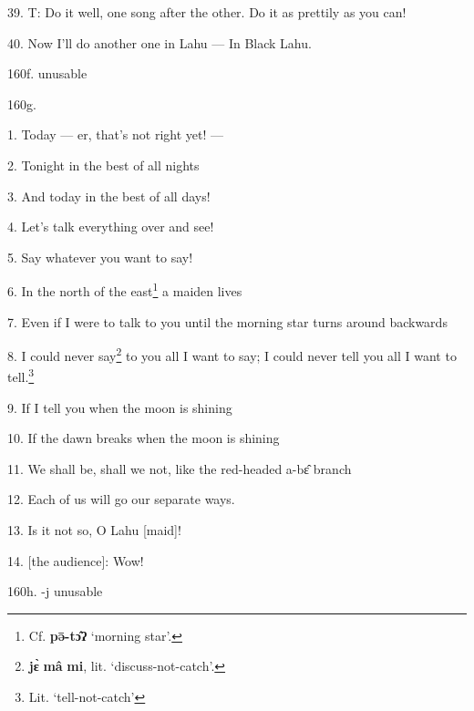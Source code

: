 39. T: Do it well, one song after the other. Do it as prettily as you can!

40. Now I'll do another one in Lahu --- In Black Lahu.

160f. unusable

160g. 

1. Today --- er, that's not right yet! ---

2. Tonight in the best of all nights

3. And today in the best of all days!

4. Let's talk everything over and see!

5. Say whatever you want to say!

6. In the north of the east\footnote{Cf. \textbf{pə̄-tɔ̂ʔ} `morning star'.} a maiden lives

7. Even if I were to talk to you until the morning star turns around backwards

8. I could never say\footnote{\textbf{jɛ̀} \textbf{mâ} \textbf{mi}, lit. `discuss-not-catch'.} to you all I want to say; I could never tell you all I want
to tell.\footnote{Lit. `tell-not-catch'}

9. If I tell you when the moon is shining

10. If the dawn breaks when the moon is shining

11. We shall be, shall we not, like the red-headed a-bɛ̂ branch

12. Each of us will go our separate ways.

13. Is it not so, O Lahu [maid]!

14. [the audience]: Wow!

160h. -j unusable

